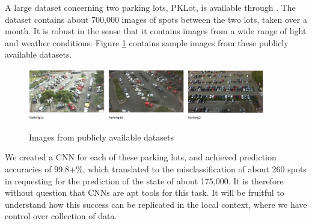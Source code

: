 \documentclass[]{article}
\let\rmarkdownfootnote\footnote%
\def\footnote{\protect\rmarkdownfootnote}
\begin{document}
A large dataset concerning two parking lots, PKLot, is available through
\cite{de2015pklot}. The dataset contains about 700,000 images of spots between
the two lots, taken over a month. It is robust in the sense that it contains
images from a wide range of light and weather conditions. Figure
\ref{fig:sample-pklot} contains sample images from these publicly available
datasets.

\begin{figure}[H]
  \centering
    \includegraphics[width=0.3\textwidth]{pklot_1a}
    \includegraphics[width=0.3\textwidth]{pklot_1b}
    \includegraphics[width=0.3\textwidth]{pklot_1c}
  \caption{Images from publicly available datasets}
  \label{fig:sample-pklot}
\end{figure}

We created a CNN for each of these parking lots, and achieved prediction
accuracies of 99.8+\%, which translated to the misclassification of
about 260 spots in requesting for the prediction of the state of about
175,000. It is therefore without question that CNNs are apt tools for
this task. It will be fruitful to understand how this success can be
replicated in the local context, where we have control over collection
of data.
\end{document}
